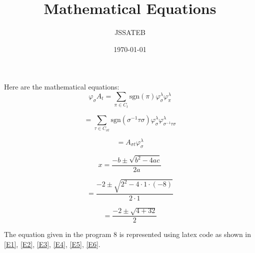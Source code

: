 \documentclass{article}
\title{Mathematical Equations}
\author{JSSATEB}
\date{\today}
\begin{document}
\maketitle

Here are the mathematical equations:
\begin{equation}
\label{E1}
\varphi_{\sigma}A_t = \sum_{\pi \in C_t} \text{sgn}(\pi) \varphi_{\sigma}^{\lambda} \varphi_{\pi}^{\lambda}
\end{equation}

\begin{equation}
\label{E2}
= \sum_{\tau \in C_{\sigma t}} \text{sgn}(\sigma^{-1} \tau \sigma) \varphi_{\sigma}^{\lambda} \varphi_{\sigma^{-1} \tau \sigma}^{\lambda}
\end{equation}

\begin{equation}
\label{E3}
= A_{\sigma t} \varphi_{\sigma}^{\lambda}
\end{equation}

\begin{equation}
\label{E4}
x = \frac{-b \pm \sqrt{b^2 - 4ac}}{2a}
\end{equation}

\begin{equation}
\label{E5}
= \frac{-2 \pm \sqrt{2^2 - 4 \cdot 1 \cdot (-8)}}{2 \cdot 1}
\end{equation}

\begin{equation}
\label{E6}
= \frac{-2 \pm \sqrt{4 + 32}}{2}
\end{equation}

The equation given in the program 8 is represented using latex code as shown in \ref{E1}, \ref{E2}, \ref{E3}, \ref{E4}, \ref{E5}, \ref{E6}. 
\end{document}
